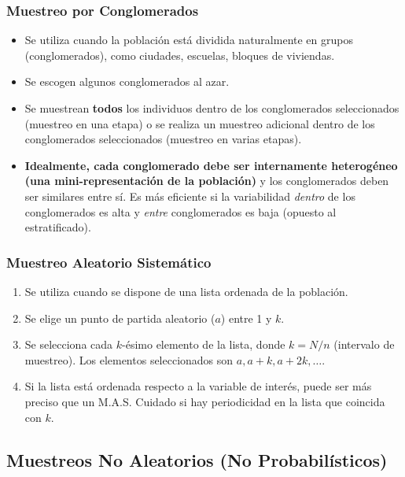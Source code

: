 \documentclass[12pt, letterpaper]{article}
\begin{document}
\subsubsection{Muestreo por Conglomerados}
\begin{itemize}
    \item Se utiliza cuando la población está dividida naturalmente en grupos (conglomerados), como ciudades, escuelas, bloques de viviendas.
    \item Se escogen algunos conglomerados al azar.
    \item Se muestrean \textbf{todos} los individuos dentro de los conglomerados seleccionados (muestreo en una etapa) o se realiza un muestreo adicional dentro de los conglomerados seleccionados (muestreo en varias etapas).
    \item \textbf{Idealmente, cada conglomerado debe ser internamente heterogéneo (una mini-representación de la población)} y los conglomerados deben ser similares entre sí. Es más eficiente si la variabilidad \textit{dentro} de los conglomerados es alta y \textit{entre} conglomerados es baja (opuesto al estratificado). %
\end{itemize}

\subsubsection{Muestreo Aleatorio Sistemático}
\begin{enumerate}
    \item Se utiliza cuando se dispone de una lista ordenada de la población.
    \item Se elige un punto de partida aleatorio ($a$) entre 1 y $k$.
    \item Se selecciona cada $k$-ésimo elemento de la lista, donde $k = N/n$ (intervalo de muestreo). Los elementos seleccionados son $a, a+k, a+2k, \dots$.
    \item Si la lista está ordenada respecto a la variable de interés, puede ser más preciso que un M.A.S. Cuidado si hay periodicidad en la lista que coincida con $k$. %
\end{enumerate}

\subsection{Muestreos No Aleatorios (No Probabilísticos)} %
\end{document}
